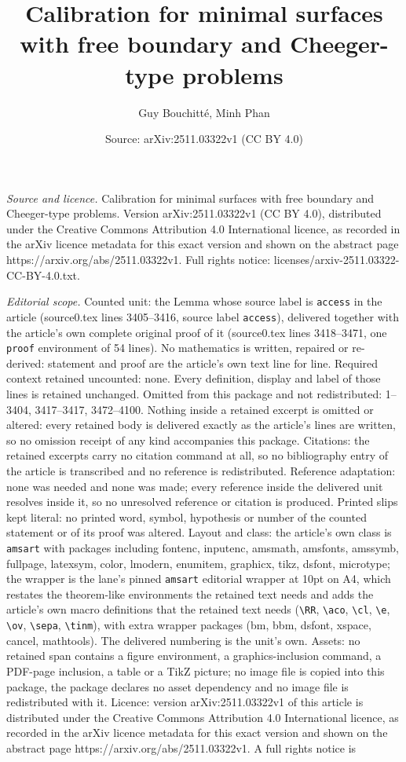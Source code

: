 \documentclass[10pt,a4paper]{amsart}
\title[Calibration for minimal surfaces with free boundary and Chee]{Calibration for minimal surfaces with free boundary and Cheeger-type problems}
\author{Guy Bouchitt\'e, Minh Phan}
\date{Source: arXiv:2511.03322v1 (CC BY 4.0)}
\begin{document}
\maketitle

\noindent\emph{Source and licence.} Calibration for minimal surfaces with free boundary and Cheeger-type problems. Version arXiv:2511.03322v1 (CC BY 4.0), distributed under the Creative Commons Attribution 4.0 International licence, as recorded in the arXiv licence metadata for this exact version and shown on the abstract page https://arxiv.org/abs/2511.03322v1. Full rights notice: licenses/arxiv-2511.03322-CC-BY-4.0.txt.\par\smallskip

\noindent\textit{Editorial scope.} Counted unit: the Lemma whose source label is \texttt{access} in the article (source0.tex lines 3405--3416, source label \texttt{access}), delivered together with the article's own complete original proof of it (source0.tex lines 3418--3471, one \texttt{proof} environment of 54 lines). No mathematics is written, repaired or re-derived: statement and proof are the article's own text line for line. Required context retained uncounted: none. Every definition, display and label of those lines is retained unchanged. Omitted from this package and not redistributed: 1--3404, 3417--3417, 3472--4100. Nothing inside a retained excerpt is omitted or altered: every retained body is delivered exactly as the article's lines are written, so no omission receipt of any kind accompanies this package. Citations: the retained excerpts carry no citation command at all, so no bibliography entry of the article is transcribed and no reference is redistributed. Reference adaptation: none was needed and none was made; every reference inside the delivered unit resolves inside it, so no unresolved reference or citation is produced. Printed slips kept literal: no printed word, symbol, hypothesis or number of the counted statement or of its proof was altered. Layout and class: the article's own class is \texttt{amsart} with packages including fontenc, inputenc, amsmath, amsfonts, amssymb, fullpage, latexsym, color, lmodern, enumitem, graphicx, tikz, dsfont, microtype; the wrapper is the lane's pinned \texttt{amsart} editorial wrapper at 10pt on A4, which restates the theorem-like environments the retained text needs and adds the article's own macro definitions that the retained text needs (\texttt{\textbackslash RR}, \texttt{\textbackslash aco}, \texttt{\textbackslash cl}, \texttt{\textbackslash e}, \texttt{\textbackslash ov}, \texttt{\textbackslash sepa}, \texttt{\textbackslash tinm}), with extra wrapper packages (bm, bbm, dsfont, xspace, cancel, mathtools). The delivered numbering is the unit's own. Assets: no retained span contains a figure environment, a graphics-inclusion command, a PDF-page inclusion, a table or a TikZ picture; no image file is copied into this package, the package declares no asset dependency and no image file is redistributed with it. Licence: version arXiv:2511.03322v1 of this article is distributed under the Creative Commons Attribution 4.0 International licence, as recorded in the arXiv licence metadata for this exact version and shown on the abstract page https://arxiv.org/abs/2511.03322v1. A full rights notice is 
\end{document}
